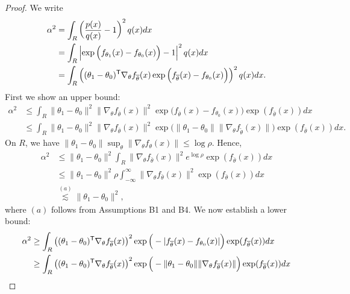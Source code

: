 \documentclass{article}
\begin{document}
\begin{proof}
We write
\begin{align*}
\alpha^2 &= \int_R \left( \frac{p(x)}{q(x)} - 1 \right)^2 q(x) dx \\
 &= \int_{R} \left| \exp\Big( f_{\theta_1}(x) - f_{\theta_0}(x) \Big) - 1 \right| ^2
            q(x )dx \\
 &= \int_{R} \left( (\theta_1 - \theta_0)^{\mathsf{T}} \nabla_{\theta} f_{\overline{\theta}}(x) 
                            \exp\Big( f_{\overline{\theta}}(x) - f_{\theta_0}(x) \Big) \right)^2 q(x)dx. 
\end{align*}
First we show an upper bound:
\begin{align*}
\alpha^2 & \leq \int_{R} \| \theta_1 - \theta_0 \|^2 \| \nabla_{\theta} f_{\bar{\theta}}(x)\|^2
                            \exp\Big( f_{\bar{\theta}}(x) - f_{\theta_0}(x) \Big)
              \exp( f_{\bar{\theta}}(x) ) dx\\
& \leq  \int_{R} \| \theta_1 - \theta_0 \|^2 \| \nabla_{\theta} f_{\bar{\theta}}(x)\|^2
                            \exp\Big( \| \theta_1 - \theta_0\| \|\nabla_{\theta} f_{\tilde{\theta}}(x) \| \Big) 
              \exp( f_{\bar{\theta}}(x) ) dx.
\end{align*}
On $R$, we have $\| \theta_1 - \theta_0\| \sup_\theta \| \nabla_\theta f_{\theta}(x) \| \leq \log \rho$. Hence,
\begin{align*}
\alpha^2 & \leq   \| \theta_1 - \theta_0 \|^2 \int_{R} \| \nabla_{\theta} f_{\bar{\theta}}(x)\|^2
                           e^{\log \rho}
              \exp( f_{\bar{\theta}}(x) ) dx\\
& \leq  \| \theta_1 - \theta_0 \|^2 \rho \int_{-\infty}^\infty \| \nabla_{\theta} f_{\bar{\theta}}(x)\|^2
              \exp( f_{\bar{\theta}}(x) ) dx \\
& \stackrel{(a)}\lesssim \| \theta_1 - \theta_0 \|^2,
\end{align*}
where $(a)$ follows from Assumptions B1 and B4. We now establish a lower bound:
\begin{align*}
\alpha^2 &\geq  \int_{R} \left( (\theta_1 - \theta_0)^\tran \nabla_{\theta} f_{\bar{\theta}}(x) \right)^2
                            \exp\Big( - |f_{\bar{\theta}}(x) - f_{\theta_0}(x)| \Big)  \exp(f_{\bar{\theta}}(x))
             dx \\
  &\geq \int_{R} \left( (\theta_1 - \theta_0)^\tran \nabla_{\theta} f_{\bar{\theta}}(x) \right)^2
                            \exp\Big( - \|\theta_1 - \theta_0\| \| \nabla_{\theta} f_{\bar{\theta}}(x) \| \Big)  
          \exp(f_{\bar{\theta}}(x)) dx \\

\end{align*}
\end{proof}
\end{document}
